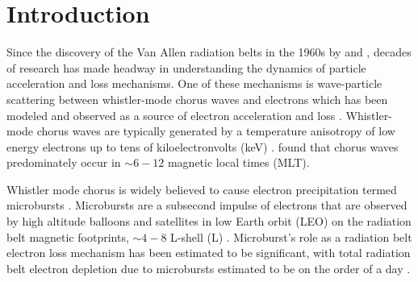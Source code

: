 \documentclass[draft]{agujournal2019}
\begin{document}
%
%
%
%


\section{Introduction}
Since the discovery of the Van Allen radiation belts in the 1960s by  and , decades of research has made headway in understanding the dynamics of particle acceleration and loss mechanisms. One of these mechanisms is wave-particle scattering between whistler-mode chorus waves and electrons which has been modeled and observed as a source of electron acceleration and loss \cite{Abel1998_1, Meredith2002, Horne2003, Thorne2005, Millan2007, Bortnik2008}. Whistler-mode chorus waves are typically generated by a temperature anisotropy of low energy electrons up to tens of kiloelectronvolts (keV) \cite{Li2009b}.  found that chorus waves predominately occur in $\sim 6-12$ magnetic local times (MLT).

Whistler mode chorus is widely believed to cause electron precipitation termed microbursts \cite{Millan2007}. Microbursts are a subsecond impulse of electrons that are observed by high altitude balloons and satellites in low Earth orbit (LEO) on the radiation belt magnetic footprints, $\sim 4 - 8$ L-shell (L) \cite{Anderson1964, Parks1967, Woodger2015, Lorentzen2001a, Lorentzen2001b, O'Brien2003, O'Brien2004, Lee2005, Lee2012, Crew2016, Breneman2017, Mozer2018}. Microburst’s role as a radiation belt electron loss mechanism has been estimated to be significant, with total radiation belt electron depletion due to microbursts estimated to be on the order of a day \cite{Lorentzen2001b, O'Brien2004, Thorne2005, Breneman2017}. 
\end{document}
